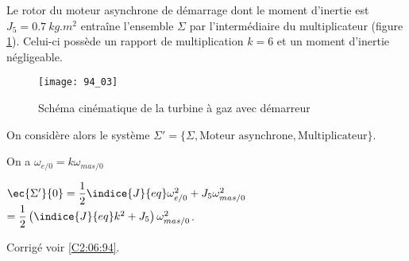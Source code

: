 Le rotor du moteur asynchrone de démarrage dont le moment d’inertie est $J_5=\SI{0,7}{kg.m^2}$ entraîne
 l’ensemble $\Sigma$ par l’intermédiaire du multiplicateur (figure \ref{fig_94_03}). Celui-ci possède un rapport de multiplication $k=6$ et un moment d’inertie négligeable.
 
 \begin{figure}[!h]
\texttt{[image: 94\_03]}
\caption{Schéma cinématique de la turbine à gaz avec démarreur \label{fig_94_03}}
\end{figure}

On considère alors le système $\Sigma' = \{ \Sigma, \text{Moteur asynchrone}, \text{Multiplicateur}\}$.
 
\ifprof 
\begin{corrige}
On a $\omega_{e/0} = k \omega_{mas/0}$

$\ec{\Sigma'}{0} = \dfrac{1}{2}\indice{J}{eq} \omega_{e/0}^2 + J_5 \omega_{mas/0}^2$
$=\dfrac{1}{2}\left(\indice{J}{eq} k^2 + J_5\right) \omega_{mas/0}^2$.
\end{corrige}
\else
\fi

 

\ifprof
\else
\begin{flushright}
\footnotesize{Corrigé  voir \ref{C2:06:94}.}
\end{flushright}%
\fi